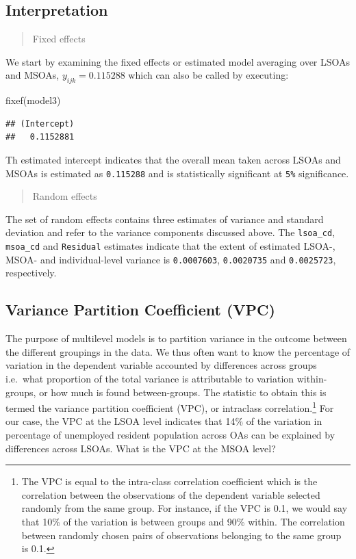 \documentclass[
]{book}
\newenvironment{Shaded}{\begin{snugshade}}{\end{snugshade}}
\newcommand{\FunctionTok}[1]{\textcolor[rgb]{0.00,0.00,0.00}{#1}}
\newcommand{\NormalTok}[1]{#1}
\begin{document}
\hypertarget{interpretation}{%
\subsection{Interpretation}\label{interpretation}}

\begin{quote}
Fixed effects
\end{quote}

We start by examining the fixed effects or estimated model averaging over LSOAs and MSOAs, \(y_{ijk} = 0.115288\) which can also be called by executing:

\begin{Shaded}
\begin{Highlighting}[]
\FunctionTok{fixef}\NormalTok{(model3)}
\end{Highlighting}
\end{Shaded}

\begin{verbatim}
## (Intercept) 
##   0.1152881
\end{verbatim}

Th estimated intercept indicates that the overall mean taken across LSOAs and MSOAs is estimated as \texttt{0.115288} and is statistically significant at \texttt{5\%} significance.

\begin{quote}
Random effects
\end{quote}

The set of random effects contains three estimates of variance and standard deviation and refer to the variance components discussed above. The \texttt{lsoa\_cd}, \texttt{msoa\_cd} and \texttt{Residual} estimates indicate that the extent of estimated LSOA-, MSOA- and individual-level variance is \texttt{0.0007603}, \texttt{0.0020735} and \texttt{0.0025723}, respectively.

\hypertarget{variance-partition-coefficient-vpc}{%
\subsection{Variance Partition Coefficient (VPC)}\label{variance-partition-coefficient-vpc}}

The purpose of multilevel models is to partition variance in the outcome between the different groupings in the data. We thus often want to know the percentage of variation in the dependent variable accounted by differences across groups i.e.~what proportion of the total variance is attributable to variation within-groups, or how much is found between-groups. The statistic to obtain this is termed the variance partition coefficient (VPC), or intraclass correlation.\footnote{The VPC is equal to the intra-class correlation coefficient which is the correlation between the observations of the dependent variable selected randomly from the same group. For instance, if the VPC is 0.1, we would say that 10\% of the variation is between groups and 90\% within. The correlation between randomly chosen pairs of observations belonging to the same group is 0.1.} For our case, the VPC at the LSOA level indicates that 14\% of the variation in percentage of unemployed resident population across OAs can be explained by differences across LSOAs. What is the VPC at the MSOA level?
\end{document}
